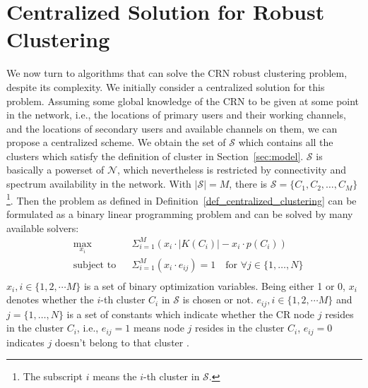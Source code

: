 \documentclass[times]{ettauth}
\newcommand{\ie}{i.e., }
\theoremstyle{mytheoremstyle}
\theoremstyle{mytheoremstyle}
\theoremstyle{mytheoremstyle}
\begin{document}
\section{Centralized Solution for Robust Clustering}
\label{centralized_solution}
We now turn to algorithms that can solve the CRN robust clustering problem, despite its complexity. 
We initially consider a centralized solution for this problem.
Assuming some global knowledge of the CRN to be given at some point in the network, \ie the locations of primary users and their working channels, and the locations of secondary users and available channels on them, we can propose a centralized scheme.
We obtain the set of $\mathcal{S}$ which contains all the clusters which satisfy the definition of cluster in Section~\ref{sec:model}.
$\mathcal{S}$ is basically a powerset of $\mathcal{N}$, which nevertheless is restricted by connectivity and spectrum availability in the network.
With $|\mathcal{S}| = M$, there is $\mathcal{S}=\{C_1, C_2, \ldots, C_M\}$ \footnote{The subscript $i$ means the $i$-th cluster in $\mathcal{S}$.}.
Then the problem as defined in Definition~\ref{def_centralized_clustering} can be formulated as a binary linear programming problem and can be solved by many available solvers:
\begin{equation}
\begin{aligned}
     &\max\limits_{x_i} && \Sigma_{i=1}^M (x_i\cdot |K(C_i)| - x_i\cdot p(C_i)) \\
     &\text{subject to}   && \Sigma_{i=1}^M (x_i\cdot e_{ij}) = 1  \quad\text{for}\,\,\forall j\in\{1, \ldots, N\} \\
\end{aligned}
\label{centralized_opt}
\end{equation}
$x_i, i\in \{1,2, \cdots M\}$ is a set of binary optimization variables.
Being either 1 or 0, $x_i$ denotes whether the $i$-th cluster $C_i$ in $\mathcal{S}$ is chosen or not.
$e_{ij}, i\in \{1,2, \cdots M\}$ and $j=\{1, \ldots, N\}$ is a set of constants which indicate whether the CR node $j$ resides in the cluster $C_i$, \ie $e_{ij}=1$ means node $j$ resides in the cluster $C_i$, $e_{ij}=0$ indicates $j$ doesn't belong to that cluster .
\end{document}
